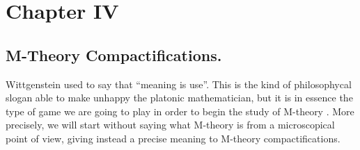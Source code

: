 

\section{Chapter IV}

\subsection{M-Theory Compactifications.}

Wittgenstein used to say that ``meaning is use''. This is the
kind of philosophycal slogan able to make unhappy the platonic
mathematician, but it is in essence the type of game we are going
to play in order to begin the study of M-theory \cite{Mth,HT,Town,Wsvd,HT2}. More precisely,
we will start without saying what M-theory is from a
microscopical point of view, giving instead a precise meaning to
M-theory compactifications.
  
